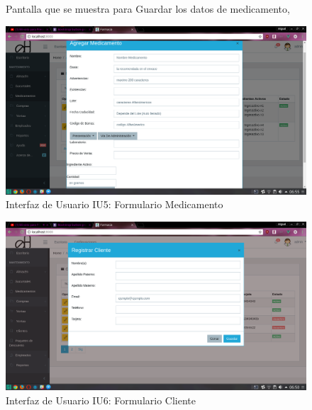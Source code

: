\begin{figure}[htbp!]
	\begin{center}
	Pantalla que se muestra para Guardar los datos de medicamento, 
	
\includegraphics[width=\textwidth]{Pantallas/FormularioMedicamento}
		\caption{Interfaz de Usuario IU5: Formulario Medicamento}
	\end{center}
\end{figure}



\begin{figure}[htbp!]
	\begin{center}
\includegraphics[width=\textwidth]{Pantallas/FormularioClientes}
		\caption{Interfaz de Usuario IU6: Formulario Cliente}
	\end{center}
\end{figure}


